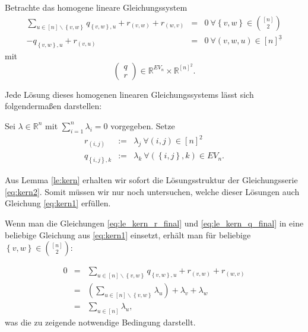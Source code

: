 \documentclass[10p,a4paper,BCOR = 12mm, DIV=15]{scrbook}
\begin{document}
\begin{Kor}
\label{kor:kern}
Betrachte das homogene lineare Gleichungssystem
\begin{eqnarray}
\sum_{u\in[n]\backslash\left\{v, w\right\}} q_{\left\{v, w\right\}, u} + r_{\left(v, w\right)} + r_{\left(w, v\right)}& = & 0\ \forall \left\{v, w\right\}\in {[n] \choose 2} \label{eq:kern1} \\
-q_{\left\{v, w\right\}, u} + r_{\left(v, u\right)} & = & 0\ \forall \left(v, w, u\right)\in [n]^{\underline{3}} \label{eq:kern2}
\end{eqnarray}
mit
\begin{displaymath}
\left(\begin{array}{c}
q \\
r
\end{array}\right) \in \mathbb{R}^{EV_n}\times \mathbb{R}^{[n]^{\underline{2}}}.
\end{displaymath}

Jede Lösung dieses homogenen linearen Gleichungssystems lässt sich folgendermaßen darstellen:

Sei $\lambda\in\mathbb{R}^n$ mit $\sum_{i=1}^n \lambda_i = 0$ vorgegeben. Setze
\begin{eqnarray*}
r_{\left(i, j\right)} & := & \lambda_j\ \forall \left(i, j\right)\in\left[n\right]^2 \\
q_{\left\{i, j\right\},k} & := & \lambda_k\ \forall \left(\left\{i, j\right\}, k\right)\in EV_n.
\end{eqnarray*}
\end{Kor}
\begin{bew}
Aus Lemma \ref{le:kern} erhalten wir sofort die Lösungsstruktur der Gleichungsserie \eqref{eq:kern2}. Somit müssen wir nur noch untersuchen, welche dieser Lösungen auch Gleichung \eqref{eq:kern1} erfüllen.

Wenn man die Gleichungen \eqref{eq:le_kern_r_final} und \eqref{eq:le_kern_q_final} in eine beliebige Gleichung aus \eqref{eq:kern1} einsetzt, erhält man für beliebige $\left\{v, w\right\}\in {[n] \choose 2}$:

\begin{eqnarray*}
0 & = & \sum_{u\in[n]\backslash\left\{v, w\right\}} q_{\left\{v, w\right\}, u} + r_{\left(v, w\right)} + r_{\left(w, 
v\right)} \\
& = & \left(\sum_{u\in[n]\backslash\left\{v, w\right\}} \lambda_u\right) + \lambda_v + \lambda_w \\
& = & \sum_{u\in[n]} \lambda_u,
\end{eqnarray*}
was die zu zeigende notwendige Bedingung darstellt.
\end{bew}
\end{document}
